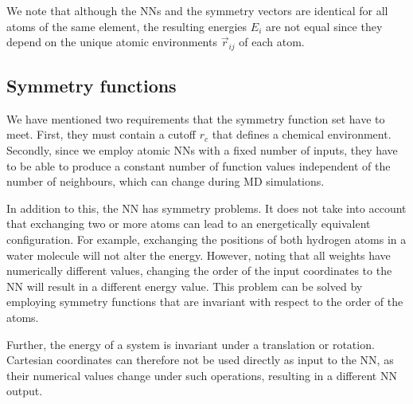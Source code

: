 \documentclass[twoside,english]{uiofysmaster}
\begin{document}
We note that although the NNs and the symmetry vectors
are identical for all atoms of the same element, the resulting energies $E_i$ are not equal since 
they depend on the unique atomic environments $\vec{r}_{ij}$ of each atom. 




\subsection{Symmetry functions} \label{sec:symmetryFunctions}
We have mentioned two requirements that the symmetry function set have to meet. First, they must contain a cutoff $r_c$
that defines a chemical environment. Secondly, since we employ atomic NNs with a fixed number of inputs,
they have to be able to produce a constant 
number of function values independent of the number of neighbours, which can change during MD simulations. 

In addition to this, the NN has symmetry problems. It does not take into account that exchanging two or more atoms
can lead to an energetically equivalent configuration. For example, exchanging the positions of both hydrogen atoms
in a water molecule will not alter the energy. However, noting that all weights have numerically different values,
changing the order of the input coordinates to the NN will result in a different energy value. This problem can be solved
by employing symmetry functions that are invariant with respect to the order of the atoms. 

Further, the energy of a system is invariant under a translation or rotation. Cartesian coordinates can therefore not be used 
directly as input to the NN, as their numerical values change under such operations, resulting in a different NN output. 
\end{document}
